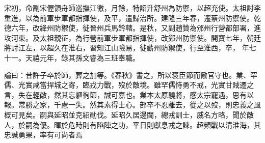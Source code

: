 \begin{pinyinscope}
 宋初，命副宋偓領舟師巡撫江徼，月餘，特詔升舒州為防禦，以超充使。太祖討李重進，以為前軍步軍都指揮使，及平，遣歸治所。建隆三年春，遷蔡州防禦使。乾德六年，改絳州防禦使，徙晉州兵馬鈐轄。是秋，又副趙贊為邠州行營都部署，進攻河東。及太祖親征，為行營前軍步軍都指揮使，改鄭州防禦使。開寶七年，朝廷將討江左，以超久在淮右，習知江山險易，徙蘄州防禦使，行至淮西，卒，
 年七十一。天禧元年，錄其孫文睿為三班奉職。



 論曰：昔許子卒於師，葬之加等。《春秋》書之，所以褒臣節而儆官守也。業、罕儒、光實咸當捍城之寄，臨戎力戰，歿於敵境。雖罕儒恃勇不戒，光實甘賊遷之言，失在輕敵，然其忘軀徇節，誠可嘉也。業本太原驍將，感太宗寵遇，思有以報。常勝之家，千慮一失。然其素得士心。部卒不忍離去，從之以歿，則忠義之風概可見矣。嗣與延昭並克紹勛伐。延昭久居邊閫，總戎訓士，威名方略，聞於敵
 人，於嗣為優。暉於危時則有陷陣之功，平日則獻息戎之諫。超頻戰以清淮海，其忠誠勇果，率有可尚者焉



\end{pinyinscope}